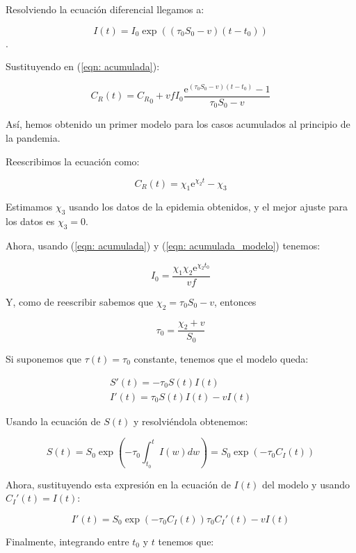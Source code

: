 Resolviendo la ecuación diferencial llegamos a:

$$I(t) = I_0\exp{((\tau_0 S_0-v)(t-t_0))}$$.

Sustituyendo en (\ref{eqn: acumulada}):

$$C_R(t) = {C_R}_0 + vfI_0\frac{\mathrm{e}^{(\tau_0 S_0 -v)(t-t_0)} -1}{\tau_0 S_0-v}$$

Así, hemos obtenido un primer modelo para los casos acumulados al principio de la pandemia.

Reescribimos la ecuación como:

\begin{equation}
\label{eqn: acumulada_modelo}
C_R(t) = \chi_1 \mathrm{e}^{\chi_2 t} -\chi_3
\end{equation}

Estimamos $\chi_3$ usando los datos de la epidemia obtenidos, y el mejor ajuste para los datos es $\chi_3=0$.

Ahora, usando (\ref{eqn: acumulada}) y (\ref{eqn: acumulada_modelo}) tenemos:

\begin{equation}
I_0=\frac{\chi_1\chi_2\mathrm{e}^{\chi_2 t_0}}{vf}
\end{equation}

Y, como de reescribir sabemos que $\chi_2 = \tau_0 S_0-v$, entonces

\begin{equation}
\tau_0 = \frac{\chi_2+v}{S_0}
\end{equation}

Si suponemos que $\tau (t) = \tau_0$ constante, tenemos que el modelo queda:

\begin{equation}
\begin{aligned}
S'(t) = -\tau_0S(t)I(t) \\
I'(t) = \tau_0S(t)I(t) -vI(t)
\end{aligned}
\end{equation}

Usando la ecuación de $S(t)$ y resolviéndola obtenemos:

$$S(t) = S_0\exp{\left( -\tau_0 \int_{t_0}^t I(w) dw \right)} = S_0\exp{(-\tau_0 C_I(t))}$$

Ahora, sustituyendo esta expresión en la ecuación de $I(t)$ del modelo y usando $C_I'(t)=I(t)$:

$$I'(t) = S_0\exp{\left( -\tau_0 C_I(t)\right) }\tau_0 C_I'(t)-vI(t)$$

Finalmente, integrando entre $t_0$ y $t$ tenemos que:

